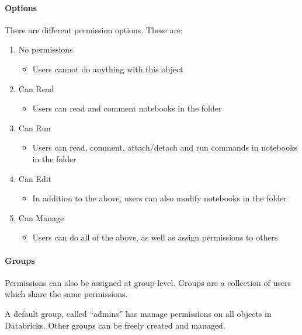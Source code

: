     \paragraph{Options}
        There are different permission options.
        These are:
        \begin{enumerate}
            \item No permissions
                \begin{itemize}
                    \item Users cannot do anything with this object
                \end{itemize}
            \item Can Read
                \begin{itemize}
                    \item Users can read and comment notebooks in the folder
                \end{itemize}
            \item Can Run
                \begin{itemize}
                    \item Users can read, comment, attach/detach and run commands in notebooks in the folder
                \end{itemize}
            \item Can Edit
                \begin{itemize}
                    \item In addition to the above, users can also modify notebooks in the folder
                \end{itemize}
            \item Can Manage
                \begin{itemize}
                    \item Users can do all of the above, as well as assign permissions to others
                \end{itemize}
        \end{enumerate}
        
    \paragraph{Groups}
        Permissions can also be assigned at group-level.
        Groups are a collection of users which share the same permissions.
        
        A default group, called ``admins'' has manage permissions on all objects in Databricks.
        Other groups can be freely created and managed.
        
